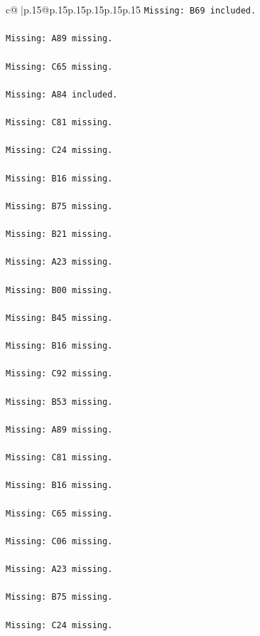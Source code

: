 \documentclass{article}
\begin{document}
{\begin{supertabular}{c@{$\;$}|p{.15\linewidth}@{}p{.15\linewidth}p{.15\linewidth}p{.15\linewidth}p{.15\linewidth}p{.15\linewidth}}
{{{\texttt{Missing: B69 included.} \\
\\ 
\texttt{Missing: A89 missing.} \\
\\ 
\texttt{Missing: C65 missing.} \\
\\ 
\texttt{Missing: A84 included.} \\
\\ 
\texttt{Missing: C81 missing.} \\
\\ 
\texttt{Missing: C24 missing.} \\
\\ 
\texttt{Missing: B16 missing.} \\
\\ 
\texttt{Missing: B75 missing.} \\
\\ 
\texttt{Missing: B21 missing.} \\
\\ 
\texttt{Missing: A23 missing.} \\
\\ 
\texttt{Missing: B00 missing.} \\
\\ 
\texttt{Missing: B45 missing.} \\
\\ 
\texttt{Missing: B16 missing.} \\
\\ 
\texttt{Missing: C92 missing.} \\
\\ 
\texttt{Missing: B53 missing.} \\
\\ 
\texttt{Missing: A89 missing.} \\
\\ 
\texttt{Missing: C81 missing.} \\
\\ 
\texttt{Missing: B16 missing.} \\
\\ 
\texttt{Missing: C65 missing.} \\
\\ 
\texttt{Missing: C06 missing.} \\
\\ 
\texttt{Missing: A23 missing.} \\
\\ 
\texttt{Missing: B75 missing.} \\
\\ 
\texttt{Missing: C24 missing.} \\
}}}
\end{supertabular}}
\end{document}
